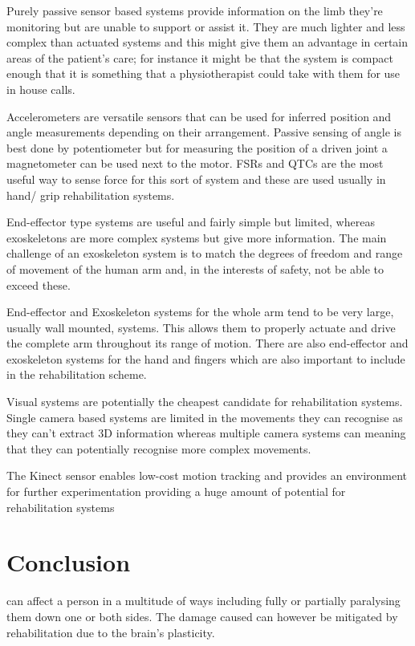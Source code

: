 \documentclass[journal]{IEEEtran}
\begin{document}
Purely passive sensor based systems provide information on the limb they're 
monitoring but are unable to support or assist it. They are much lighter 
and less complex than actuated systems and this might give them an advantage 
in certain areas of the patient's care; for instance it might be that the 
system is compact enough that it is something that a physiotherapist could 
take with them for use in house calls.

Accelerometers are versatile sensors that can be used for inferred position and angle 
measurements depending on their arrangement. Passive sensing of angle is best done by 
potentiometer but for measuring the position of a driven joint a magnetometer can 
be used next to the motor. FSRs and QTCs are the most useful way to sense force for 
this sort of system and these are used usually in hand/ grip rehabilitation systems.

End-effector type systems are useful and fairly simple but limited, whereas 
exoskeletons are more complex systems but give more information. The main 
challenge of an exoskeleton system is to match the degrees of freedom and 
range of movement of the human arm and, in the interests of safety, not be 
able to exceed these.

End-effector and Exoskeleton systems for the whole arm tend to be very large, 
usually wall mounted, systems. This allows them to properly actuate and drive the 
complete arm throughout its range of motion. There are also end-effector and 
exoskeleton systems for the hand and fingers which are also important to 
include in the rehabilitation scheme.

Visual systems are potentially the cheapest candidate for rehabilitation systems. 
Single camera based systems are limited in the movements they can recognise as 
they can't extract 3D information whereas multiple camera systems can meaning 
that they can potentially recognise more complex movements.

The Kinect sensor enables low-cost motion tracking and provides an environment 
for further experimentation providing a huge amount of potential for 
rehabilitation systems

\section{Conclusion}
 can affect a person in a multitude of ways including fully or 
partially paralysing them down one or both sides. The damage caused can however be 
mitigated by rehabilitation due to the brain's plasticity.
\end{document}
